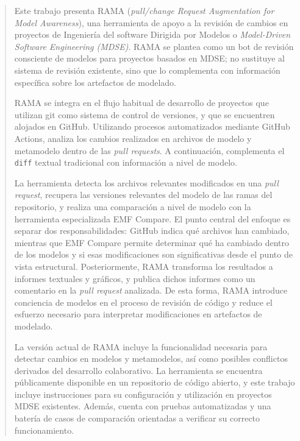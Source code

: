 \documentclass[11pt]{article}
\begin{document}
\onehalfspacing
\renewcommand{\cftsecleader}{\cftdotfill{\cftdotsep}}

\newpage
\null
\thispagestyle{empty}
\newpage

\tableofcontents
\listoffigures

\newpage

{}
\begin{abstract}
Este trabajo presenta RAMA (\textit{pull/change Request Augmentation for Model Awareness}), una herramienta de apoyo a la revisión de cambios en proyectos de Ingeniería del software Dirigida por Modelos o \textit{Model-Driven Software Engineering (MDSE)}. RAMA se plantea como un bot de revisión consciente de modelos para proyectos basados en MDSE; no sustituye al sistema de revisión existente, sino que lo complementa con información específica sobre los artefactos de modelado.

RAMA se integra en el flujo habitual de desarrollo de proyectos que utilizan git como sistema de control de versiones, y que se encuentren alojados en GitHub. Utilizando procesos automatizados  mediante GitHub Actions, analiza los cambios realizados en archivos de modelo y metamodelo dentro de las \textit{pull requests}. A continuación, complementa el \texttt{diff} textual tradicional con información a nivel de modelo.

La herramienta detecta los archivos relevantes modificados en una \textit{pull request}, recupera las versiones relevantes del modelo de las ramas del repositorio, y realiza una comparación a nivel de modelo con la herramienta especializada EMF Compare. El punto central del enfoque es separar dos responsabilidades: GitHub indica qué archivos han cambiado, mientras que EMF Compare permite determinar qué ha cambiado dentro de los modelos y si esas modificaciones son significativas desde el punto de vista estructural. Posteriormente, RAMA transforma los resultados a informes textuales y gráficos, y publica dichos informes como un comentario en la \textit{pull request} analizada. De esta forma, RAMA introduce conciencia de modelos en el proceso de revisión de código y reduce el esfuerzo necesario para interpretar modificaciones en artefactos de modelado.

La versión actual de RAMA incluye la funcionalidad necesaria para detectar cambios en modelos y metamodelos, así como posibles conflictos derivados del desarrollo colaborativo. La herramienta se encuentra públicamente disponible en un repositorio de código abierto, y este trabajo incluye instrucciones para su configuración y utilización en proyectos MDSE existentes. Además, cuenta con pruebas automatizadas y una batería de casos de comparación orientadas a verificar su correcto funcionamiento.
\end{abstract}
\end{document}
